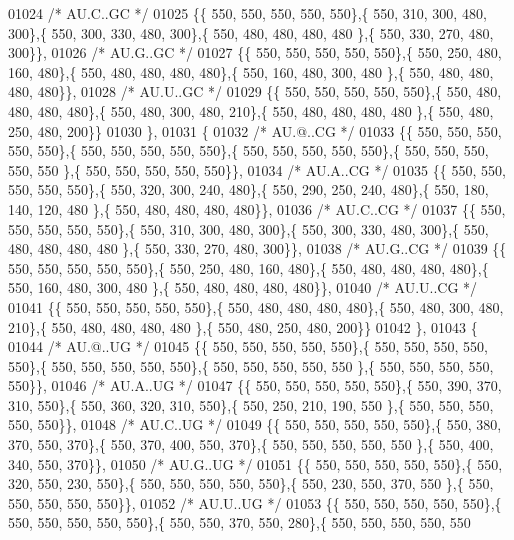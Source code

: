 \begin{DoxyCode}
01024 \textcolor{comment}{/* AU.C..GC */}
01025 \{\{ 550, 550, 550, 550, 550\},\{ 550, 310, 300, 480, 300\},\{ 550, 300, 330, 480, 300\},\{ 550, 480, 480, 480, 480
      \},\{ 550, 330, 270, 480, 300\}\},
01026 \textcolor{comment}{/* AU.G..GC */}
01027 \{\{ 550, 550, 550, 550, 550\},\{ 550, 250, 480, 160, 480\},\{ 550, 480, 480, 480, 480\},\{ 550, 160, 480, 300, 480
      \},\{ 550, 480, 480, 480, 480\}\},
01028 \textcolor{comment}{/* AU.U..GC */}
01029 \{\{ 550, 550, 550, 550, 550\},\{ 550, 480, 480, 480, 480\},\{ 550, 480, 300, 480, 210\},\{ 550, 480, 480, 480, 480
      \},\{ 550, 480, 250, 480, 200\}\}
01030 \},
01031 \{
01032 \textcolor{comment}{/* AU.@..CG */}
01033 \{\{ 550, 550, 550, 550, 550\},\{ 550, 550, 550, 550, 550\},\{ 550, 550, 550, 550, 550\},\{ 550, 550, 550, 550, 550
      \},\{ 550, 550, 550, 550, 550\}\},
01034 \textcolor{comment}{/* AU.A..CG */}
01035 \{\{ 550, 550, 550, 550, 550\},\{ 550, 320, 300, 240, 480\},\{ 550, 290, 250, 240, 480\},\{ 550, 180, 140, 120, 480
      \},\{ 550, 480, 480, 480, 480\}\},
01036 \textcolor{comment}{/* AU.C..CG */}
01037 \{\{ 550, 550, 550, 550, 550\},\{ 550, 310, 300, 480, 300\},\{ 550, 300, 330, 480, 300\},\{ 550, 480, 480, 480, 480
      \},\{ 550, 330, 270, 480, 300\}\},
01038 \textcolor{comment}{/* AU.G..CG */}
01039 \{\{ 550, 550, 550, 550, 550\},\{ 550, 250, 480, 160, 480\},\{ 550, 480, 480, 480, 480\},\{ 550, 160, 480, 300, 480
      \},\{ 550, 480, 480, 480, 480\}\},
01040 \textcolor{comment}{/* AU.U..CG */}
01041 \{\{ 550, 550, 550, 550, 550\},\{ 550, 480, 480, 480, 480\},\{ 550, 480, 300, 480, 210\},\{ 550, 480, 480, 480, 480
      \},\{ 550, 480, 250, 480, 200\}\}
01042 \},
01043 \{
01044 \textcolor{comment}{/* AU.@..UG */}
01045 \{\{ 550, 550, 550, 550, 550\},\{ 550, 550, 550, 550, 550\},\{ 550, 550, 550, 550, 550\},\{ 550, 550, 550, 550, 550
      \},\{ 550, 550, 550, 550, 550\}\},
01046 \textcolor{comment}{/* AU.A..UG */}
01047 \{\{ 550, 550, 550, 550, 550\},\{ 550, 390, 370, 310, 550\},\{ 550, 360, 320, 310, 550\},\{ 550, 250, 210, 190, 550
      \},\{ 550, 550, 550, 550, 550\}\},
01048 \textcolor{comment}{/* AU.C..UG */}
01049 \{\{ 550, 550, 550, 550, 550\},\{ 550, 380, 370, 550, 370\},\{ 550, 370, 400, 550, 370\},\{ 550, 550, 550, 550, 550
      \},\{ 550, 400, 340, 550, 370\}\},
01050 \textcolor{comment}{/* AU.G..UG */}
01051 \{\{ 550, 550, 550, 550, 550\},\{ 550, 320, 550, 230, 550\},\{ 550, 550, 550, 550, 550\},\{ 550, 230, 550, 370, 550
      \},\{ 550, 550, 550, 550, 550\}\},
01052 \textcolor{comment}{/* AU.U..UG */}
01053 \{\{ 550, 550, 550, 550, 550\},\{ 550, 550, 550, 550, 550\},\{ 550, 550, 370, 550, 280\},\{ 550, 550, 550, 550, 550

\end{DoxyCode}
